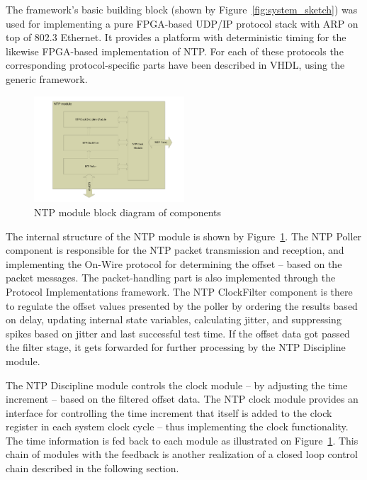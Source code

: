 \documentclass[journal]{IEEEtran}
\begin{document}
The framework's basic building block (shown by Figure~\ref{fig:system_sketch}) was used for implementing a pure FPGA-based
UDP/IP protocol stack with ARP on top of 802.3 Ethernet. It provides a platform with deterministic timing for the
likewise FPGA-based
implementation of NTP. For each of these protocols the corresponding protocol-specific parts have been described in
VHDL, using the generic framework.

\begin{figure}[!htb]
    \centering
    \includegraphics[width=0.5\textwidth]{figures_raw/ntp-sketch.pdf}
    \caption{NTP module block diagram of components}
    \label{fig:ntp-impl}
\end{figure}

The internal structure of the NTP module is shown by Figure~\ref{fig:ntp-impl}. The NTP Poller component is responsible
for the NTP packet transmission and reception, and implementing the On-Wire protocol
for determining the offset -- based on the packet messages. The packet-handling part is also implemented
through the Protocol Implementations framework. The NTP ClockFilter component is there to regulate the offset values
presented by the poller by ordering the results based on delay, updating internal state variables, calculating jitter,
and
suppressing spikes based on jitter and last successful test time. If the offset data got passed the filter stage, it gets
forwarded for further processing by the NTP Discipline module.

The NTP Discipline module controls the clock module -- by adjusting the time increment -- based on the filtered offset
data. The NTP clock module provides an interface for controlling the time increment that itself is added to the clock
register in each system clock cycle -- thus
implementing the clock functionality. The time information is fed back to each module as illustrated on
Figure~\ref{fig:ntp-impl}.
This chain of modules with the feedback is another realization of a closed loop control chain described in the following section.
\end{document}
